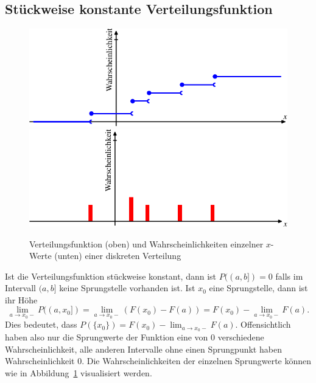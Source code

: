 \subsection{Stückweise konstante Verteilungsfunktion}
\begin{figure}
\begin{center}
\includegraphics{images/verteilungsfunktion-3}
\includegraphics{images/verteilungsfunktion-5}
\end{center}
\caption{Verteilungsfunktion (oben) und Wahrscheinlichkeiten einzelner
$x$-Werte (unten) einer diskreten Verteilung
\label{bilddiskreteverteilungsfunktion}}
\end{figure}
Ist die Verteilungsfunktion stückweise konstant, dann ist
$P((a,b])=0$ falls im Intervall $(a,b]$ keine Sprungstelle
vorhanden ist.
Ist $x_0$ eine Sprungstelle, dann ist ihr Höhe
\[
\lim_{a\to x_0-}P((a,x_0])
=
\lim_{a\to x_0-}(F(x_0)-F(a))
=
F(x_0)-\lim_{a\to x_0-}F(a).
\]
Dies bedeutet, dass $P(\{x_0\})=F(x_0)-\lim_{a\to x_0-}F(a)$.
Offensichtlich haben also nur die Sprungwerte der Funktion eine
von 0 verschiedene Wahrscheinlichkeit, alle anderen Intervalle ohne
einen Sprungpunkt haben Wahrscheinlichkeit 0.
Die Wahrscheinlichkeiten
der einzelnen Sprungwerte können wie in
Abbildung~\ref{bilddiskreteverteilungsfunktion} visualisiert werden.

